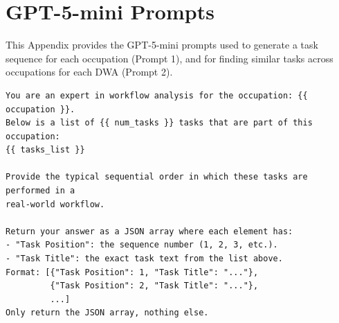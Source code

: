 \section{GPT-5-mini Prompts}
\label{app:prompts}

This Appendix provides the GPT-5-mini prompts used to generate a task sequence for each occupation (Prompt 1), and for finding similar tasks across occupations for each DWA (Prompt 2). \\

\begin{tcolorbox}[colback=gray!5, colframe=black!60, title={Prompt \#1: GPT-5-mini Prompt for Ordering of Tasks in Occupation}]
\begin{verbatim}
You are an expert in workflow analysis for the occupation: {{ occupation }}. 
Below is a list of {{ num_tasks }} tasks that are part of this occupation:
{{ tasks_list }}

Provide the typical sequential order in which these tasks are performed in a 
real-world workflow. 

Return your answer as a JSON array where each element has:
- "Task Position": the sequence number (1, 2, 3, etc.).
- "Task Title": the exact task text from the list above.
Format: [{"Task Position": 1, "Task Title": "..."}, 
         {"Task Position": 2, "Task Title": "..."},
         ...]
Only return the JSON array, nothing else.
\end{verbatim}
\end{tcolorbox}

